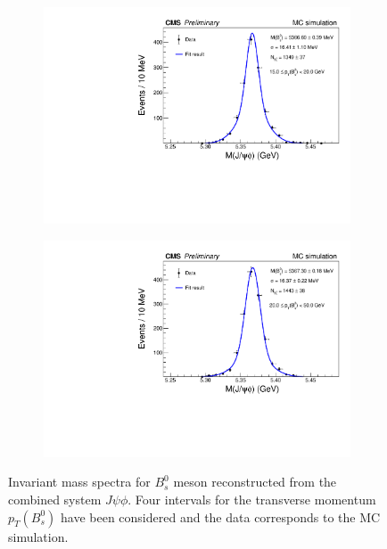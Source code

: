 \begin{figure}
\begin{subfigure}[b]{0.475\textwidth}
		\includegraphics[width=\textwidth]{MainContent/Figs/mass/mass_BsFitMC_best1_ptbins_15_20.PDF}
		\caption{}
	\end{subfigure}
	\hfill
	\begin{subfigure}[b]{0.475\textwidth}
		\centering
		\includegraphics[width=\textwidth]{MainContent/Figs/mass/mass_BsFitMC_best1_ptbins_20_50.PDF}
		\caption{}%
	\end{subfigure}
	\caption{Invariant mass spectra for $B^0_s$ meson reconstructed from the combined system $J\psi \phi$. Four intervals for the transverse momentum $p_T(B^0_s)$ have been considered and the data corresponds to the MC simulation.}
	\label{fig:massMC_ptbins}
\end{figure}



